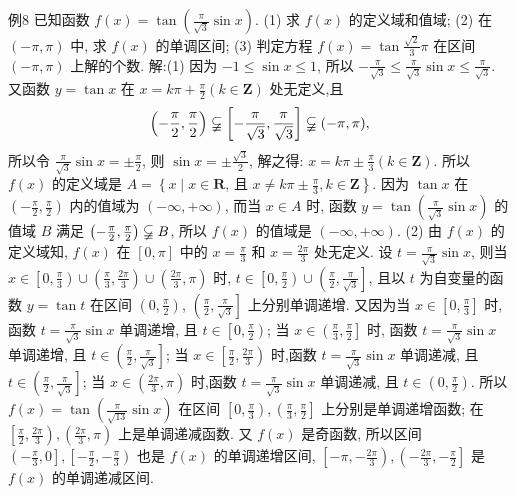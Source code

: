 例8 已知函数 $f(x)=\tan \left(\frac{\pi}{\sqrt{3}} \sin x\right)$.
(1) 求 $f(x)$ 的定义域和值域;
(2) 在 $(-\pi, \pi)$ 中, 求 $f(x)$ 的单调区间;
(3) 判定方程 $f(x)=\tan \frac{\sqrt{2}}{3} \pi$ 在区间 $(-\pi, \pi)$ 上解的个数.
解:(1) 因为 $-1 \leqslant \sin x \leqslant 1$, 所以 $-\frac{\pi}{\sqrt{3}} \leqslant \frac{\pi}{\sqrt{3}} \sin x \leqslant \frac{\pi}{\sqrt{3}}$.
又函数 $y=\tan x$ 在 $x=k \pi+\frac{\pi}{2}(k \in \mathbf{Z})$ 处无定义,且
$$
\left(-\frac{\pi}{2}, \frac{\pi}{2}\right) \varsubsetneqq\left[-\frac{\pi}{\sqrt{3}}, \frac{\pi}{\sqrt{3}}\right] \varsubsetneqq(-\pi, \pi),
$$
所以令 $\frac{\pi}{\sqrt{3}} \sin x= \pm \frac{\pi}{2}$, 则 $\sin x= \pm \frac{\sqrt{3}}{2}$, 解之得: $x=k \pi \pm \frac{\pi}{3}(k \in \mathbf{Z})$.
所以 $f(x)$ 的定义域是 $A=\left\{x \mid x \in \mathbf{R}\right.$, 且 $\left.x \neq k \pi \pm \frac{\pi}{3}, k \in \mathbf{Z}\right\}$.
因为 $\tan x$ 在 $\left(-\frac{\pi}{2}, \frac{\pi}{2}\right)$ 内的值域为 $(-\infty,+\infty)$, 而当 $x \in A$ 时, 函数 $y=\tan \left(\frac{\pi}{\sqrt{3}} \sin x\right)$ 的值域 $B$ 满足 $\left(-\frac{\pi}{2}, \frac{\pi}{2}\right) \varsubsetneqq B$, 所以 $f(x)$ 的值域是 $(-\infty,+\infty)$.
(2) 由 $f(x)$ 的定义域知, $f(x)$ 在 $[0, \pi]$ 中的 $x=\frac{\pi}{3}$ 和 $x=\frac{2 \pi}{3}$ 处无定义.
设 $t=\frac{\pi}{\sqrt{3}} \sin x$, 则当 $x \in\left[0, \frac{\pi}{3}\right) \cup\left(\frac{\pi}{3}, \frac{2 \pi}{3}\right) \cup\left(\frac{2 \pi}{3}, \pi\right)$ 时, $t \in \left[0, \frac{\pi}{2}\right) \cup\left(\frac{\pi}{2}, \frac{\pi}{\sqrt{3}}\right]$, 且以 $t$ 为自变量的函数 $y=\tan t$ 在区间 $\left(0, \frac{\pi}{2}\right)$, $\left(\frac{\pi}{2}, \frac{\pi}{\sqrt{3}}\right]$ 上分别单调递增.
又因为当 $x \in\left[0, \frac{\pi}{3}\right]$ 时, 函数 $t=\frac{\pi}{\sqrt{3}} \sin x$ 单调递增, 且 $t \in\left[0, \frac{\pi}{2}\right)$; 当 $x \in\left(\frac{\pi}{3}, \frac{\pi}{2}\right]$ 时, 函数 $t=\frac{\pi}{\sqrt{3}} \sin x$ 单调递增, 且 $t \in\left(\frac{\pi}{2}, \frac{\pi}{\sqrt{3}}\right]$;
当 $x \in\left[\frac{\pi}{2}, \frac{2 \pi}{3}\right)$ 时,函数 $t=\frac{\pi}{\sqrt{3}} \sin x$ 单调递减, 且 $t \in\left(\frac{\pi}{2}, \frac{\pi}{\sqrt{3}}\right]$;
当 $x \in\left(\frac{2 \pi}{3}, \pi\right)$ 时,函数 $t=\frac{\pi}{\sqrt{3}} \sin x$ 单调递减, 且 $t \in\left(0, \frac{\pi}{2}\right)$.
所以 $f(x)=\tan \left(\frac{\pi}{\sqrt{13}} \sin x\right)$ 在区间 $\left[0, \frac{\pi}{3}\right),\left(\frac{\pi}{3}, \frac{\pi}{2}\right]$ 上分别是单调递增函数; 在 $\left[\frac{\pi}{2}, \frac{2 \pi}{3}\right),\left(\frac{2 \pi}{3}, \pi\right)$ 上是单调递减函数.
又 $f(x)$ 是奇函数, 所以区间 $\left(-\frac{\pi}{3}, 0\right],\left[-\frac{\pi}{2},-\frac{\pi}{3}\right)$ 也是 $f(x)$ 的单调递增区间, $\left[-\pi,-\frac{2 \pi}{3}\right),\left(-\frac{2 \pi}{3},-\frac{\pi}{2}\right]$ 是 $f(x)$ 的单调递减区间.
